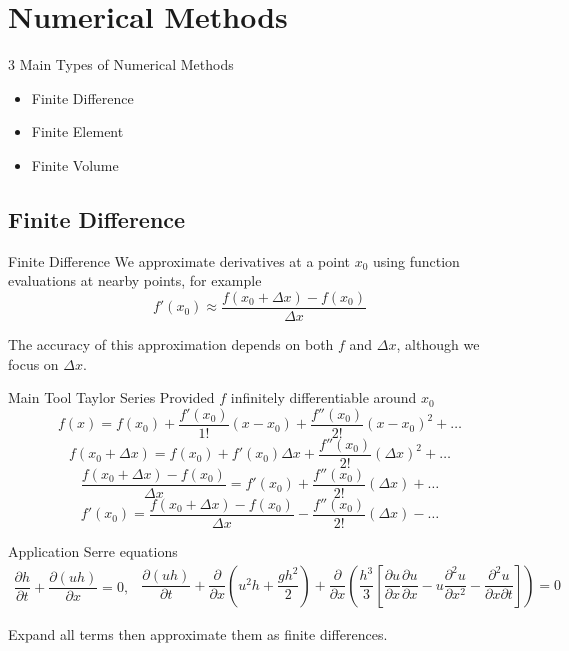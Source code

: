 \documentclass[pdf]{beamer}
\begin{document}
\section{Numerical Methods}
\begin{frame}
	3 Main Types of Numerical Methods
	\begin{itemize}
		\item Finite Difference
		\item Finite Element
		\item Finite Volume
	\end{itemize}
\end{frame}

\subsection{Finite Difference}
\begin{frame}{Finite Difference}
	We approximate derivatives at a point $x_0$ using function evaluations at nearby points, for example
	\[f'(x_0) \approx \frac{f(x_0+\Delta x) - f(x_0)}{\Delta x}\]
	
	The accuracy of this approximation depends on both $f$ and $\Delta x$, although we focus on $\Delta x$.
\end{frame}
\begin{frame}{Main Tool Taylor Series}
	Provided $f$ infinitely differentiable around $x_0$
	\[ f(x) = f(x_0) + \frac{f'(x_0)}{1!}(x - x_0) + \frac{f''(x_0)}{2!}(x - x_0)^2 + \dots\]
	\pause
	\[ f(x_0 + \Delta x) = f(x_0) + f'(x_0)\Delta x + \frac{f''(x_0)}{2!}(\Delta x)^2 + \dots\]
\pause	
	\[ \frac{f(x_0 + \Delta x) - f(x_0)}{\Delta x} = f'(x_0) + \frac{f''(x_0)}{2!}(\Delta x) +   \dots\]
\pause
	\[  f'(x_0)  = \frac{f(x_0 + \Delta x) - f(x_0)}{\Delta x} - \frac{f''(x_0)}{2!}(\Delta x) -   \dots\]
	
\end{frame}
\begin{frame}{Application}
	Serre equations
	\begin{subequations}
		\begin{gather*}
		\dfrac{\partial h}{\partial t} + \dfrac{\partial (uh)}{\partial x} = 0,
		\end{gather*}
		\begin{gather*}
		\dfrac{\partial (uh)}{\partial t} + \dfrac{\partial}{\partial x} \left ( u^2h + \dfrac{gh^2}{2}\right )+ \dfrac{\partial}{\partial x} \left (  \dfrac{h^3}{3} \left [ \dfrac{\partial u }{\partial x} \dfrac{\partial u}{\partial x} -u \dfrac{\partial^2 u}{\partial x^2}  - \dfrac{\partial^2 u}{\partial x \partial t}\right ] \right )= 0
		\end{gather*}
	\end{subequations}
	
Expand all terms then approximate them as finite differences.
\end{frame}
\end{document}
